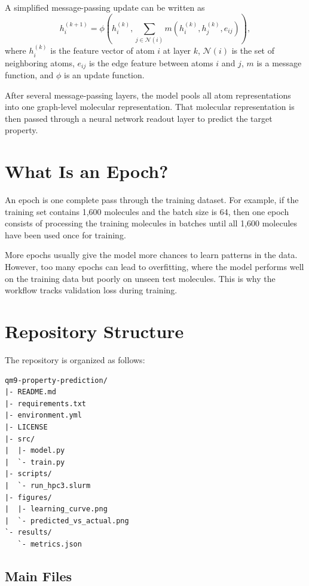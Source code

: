 \documentclass[11pt]{article}
\begin{document}
A simplified message-passing update can be written as
\begin{equation}
    h_i^{(k+1)} =
    \phi\left(
    h_i^{(k)},
    \sum_{j \in \mathcal{N}(i)}
    m\left(h_i^{(k)}, h_j^{(k)}, e_{ij}\right)
    \right),
\end{equation}
where $h_i^{(k)}$ is the feature vector of atom $i$ at layer $k$, $\mathcal{N}(i)$ is the set of neighboring atoms, $e_{ij}$ is the edge feature between atoms $i$ and $j$, $m$ is a message function, and $\phi$ is an update function.

After several message-passing layers, the model pools all atom representations into one graph-level molecular representation. That molecular representation is then passed through a neural network readout layer to predict the target property.

\section{What Is an Epoch?}

An epoch is one complete pass through the training dataset. For example, if the training set contains 1,600 molecules and the batch size is 64, then one epoch consists of processing the training molecules in batches until all 1,600 molecules have been used once for training.

More epochs usually give the model more chances to learn patterns in the data. However, too many epochs can lead to overfitting, where the model performs well on the training data but poorly on unseen test molecules. This is why the workflow tracks validation loss during training.

\section{Repository Structure}

The repository is organized as follows:

\begin{lstlisting}
qm9-property-prediction/
|- README.md
|- requirements.txt
|- environment.yml
|- LICENSE
|- src/
|  |- model.py
|  `- train.py
|- scripts/
|  `- run_hpc3.slurm
|- figures/
|  |- learning_curve.png
|  `- predicted_vs_actual.png
`- results/
   `- metrics.json
\end{lstlisting}

\subsection{Main Files}
\end{document}
